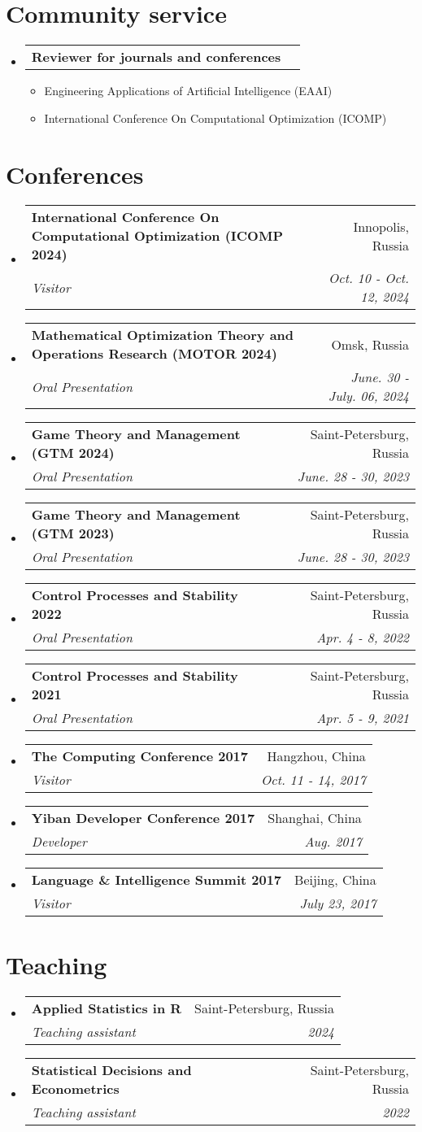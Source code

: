 \documentclass[letterpaper,10pt]{article}
\makeatletter
\newcommand{\resumeItem}[1]{
  \item\small{
    {#1 \vspace{-2pt}}
  }
}
\newcommand{\resumeSubheading}[4]{
  \vspace{-2pt}\item
  \begin{tabular*}{0.97\textwidth}[t]{l@{\extracolsep{\fill}}r}
    \textbf{#1} & #2 \\
    \textit{\small#3} & \textit{\small #4} \\
  \end{tabular*}\vspace{-7pt}
}
\newcommand{\resumeProjectHeading}[2]{
  \item
  \begin{tabular*}{0.97\textwidth}{l@{\extracolsep{\fill}}r}
    \small#1 & #2 \\
  \end{tabular*}\vspace{-7pt}
}
\newenvironment{resumeSubHeadingList}{\begin{itemize}[leftmargin=0.15in, label={}]}{\end{itemize}}
\newenvironment{resumeItemList}{\begin{itemize}}{\end{itemize}}
\makeatother
\begin{document}
\section{Community service}
\begin{resumeSubHeadingList}
  \resumeProjectHeading{{\bf Reviewer for journals and conferences}}{}
  \begin{resumeItemList}
    \resumeItem{Engineering Applications of Artificial Intelligence (EAAI)}
    \resumeItem{International Conference On Computational Optimization (ICOMP)}
  \end{resumeItemList}
\end{resumeSubHeadingList}
\section{Conferences}
\begin{resumeSubHeadingList}
  \resumeSubheading{International Conference On Computational Optimization
                    (ICOMP 2024)}{Innopolis, Russia}{Visitor}{Oct. 10 - Oct.
                    12, 2024}
  \resumeSubheading{Mathematical Optimization Theory and Operations Research
                    (MOTOR 2024)}{Omsk, Russia}{Oral Presentation}{June. 30 -
                    July. 06, 2024}
  \resumeSubheading{Game Theory and Management (GTM 2024)}{Saint-Petersburg,
                    Russia}{Oral Presentation}{June. 28 - 30, 2023}
  \resumeSubheading{Game Theory and Management (GTM 2023)}{Saint-Petersburg,
                    Russia}{Oral Presentation}{June. 28 - 30, 2023}
  \resumeSubheading{Control Processes and Stability 2022}{Saint-Petersburg,
                    Russia}{Oral Presentation}{Apr. 4 - 8, 2022}
  \resumeSubheading{Control Processes and Stability 2021}{Saint-Petersburg,
                    Russia}{Oral Presentation}{Apr. 5 - 9, 2021}
  \resumeSubheading{The Computing Conference 2017}{Hangzhou,
                    China}{Visitor}{Oct. 11 - 14, 2017}
  \resumeSubheading{Yiban Developer Conference 2017}{Shanghai,
                    China}{Developer}{Aug. 2017}
  \resumeSubheading{Language \& Intelligence Summit 2017}{Beijing,
                    China}{Visitor}{July 23, 2017}
\end{resumeSubHeadingList}
\section{Teaching}
\begin{resumeSubHeadingList}
  \resumeSubheading{Applied Statistics in R}{Saint-Petersburg, Russia}{Teaching
                    assistant}{2024}
  \resumeSubheading{Statistical Decisions and Econometrics}{Saint-Petersburg,
                    Russia}{Teaching assistant}{2022}
\end{resumeSubHeadingList}
\end{document}
